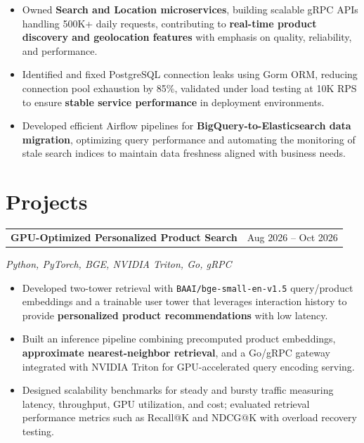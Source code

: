 \documentclass[letterpaper,10pt]{article}
\makeatletter
\newcommand{\entry}[2]{%
  \noindent  
  \begin{tabularx}{\linewidth}  
    {@{}>{\raggedright\arraybackslash}X@{\hspace{6pt}}r@{}}  
    \textbf{#1} & #2  
  \end{tabularx}\par  
}
\newcommand{\bullets}{  
  \begin{itemize}[  
    leftmargin=1.2em,  
    topsep=2pt,  
    itemsep=1pt,  
    parsep=0pt,  
    partopsep=0pt  
  ]  
}
\newcommand{\finishbullets}{  
  \end{itemize}  
}
\makeatother
\begin{document}
\bullets  

  \item Owned \textbf{Search and Location microservices}, building scalable gRPC APIs handling 500K+ daily requests, contributing to \textbf{real-time product discovery and geolocation features} with emphasis on quality, reliability, and performance.  

  \item Identified and fixed PostgreSQL connection leaks using Gorm ORM, reducing connection pool exhaustion by 85\%, validated under load testing at 10K RPS to ensure \textbf{stable service performance} in deployment environments.  

  \item Developed efficient Airflow pipelines for \textbf{BigQuery-to-Elasticsearch data migration}, optimizing query performance and automating the monitoring of stale search indices to maintain data freshness aligned with business needs.  

\finishbullets  

\section{Projects}  

\entry  
  {GPU-Optimized Personalized Product Search}  
  {Aug 2026 -- Oct 2026}  

\textit{Python, PyTorch, BGE, NVIDIA Triton, Go, gRPC}  

\bullets  

  \item Developed two-tower retrieval with \texttt{BAAI/bge-small-en-v1.5} query/product embeddings and a trainable user tower that leverages interaction history to provide \textbf{personalized product recommendations} with low latency.  

  \item Built an inference pipeline combining precomputed product embeddings, \textbf{approximate nearest-neighbor retrieval}, and a Go/gRPC gateway integrated with NVIDIA Triton for GPU-accelerated query encoding serving.  

  \item Designed scalability benchmarks for steady and bursty traffic measuring latency, throughput, GPU utilization, and cost; evaluated retrieval performance metrics such as Recall@K and NDCG@K with overload recovery testing.  

\finishbullets  
\end{document}
